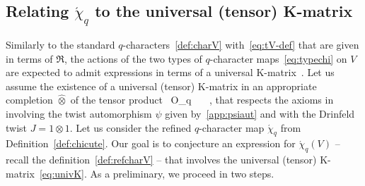 \documentclass[11pt]{amsart}
\numberwithin{equation}{section}
\numberwithin{equation}{section}
\begin{document}
\subsection{Relating $\acute{\chi}_q$ to the universal (tensor) K-matrix}\label{sec:defchi} 
Similarly to the standard $q$-characters~\eqref{def:charV} with~\eqref{eq:tV-def} that are given in terms of $\mathfrak{R}$, the actions of the two types of $q$-character maps~\eqref{eq:typechi} on $V$ are expected to admit expressions in terms of a universal K-matrix~\cite[Sec.\,1.6.1]{AV24}. Let us assume the existence of a universal (tensor) K-matrix in an appropriate completion $\widehat{\otimes}$ of the tensor product
\beqa
{}\ \in O_q \ \widehat{\otimes}\  \Loop\ , \label{eq:univK}
\eeqa
 that respects the axioms in~\cite[Def.\,2.7]{LBG} involving the twist automorphism $\psi$ given by~\eqref{app:psiaut} and with the Drinfeld twist $J=1\otimes1$.
Let us consider the refined $q$-character map $\acute{\chi}_q$ from Definition~\ref{def:chicute}. 
Our goal is to conjecture an expression for $\acute\chi_q(V)$ -- recall the definition~\eqref{def:refcharV} -- that involves the universal (tensor) K-matrix~\eqref{eq:univK}. As a preliminary, we proceed in two steps.
\end{document}

